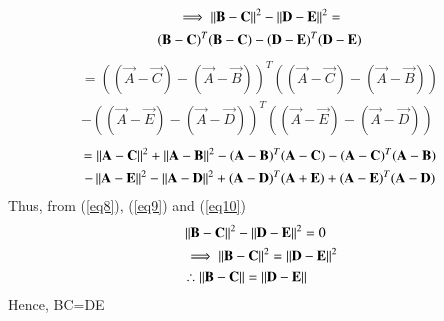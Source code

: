 \documentclass[journal,12pt,twocolumn]{IEEEtran}
\begin{document}
\begin{multline}
\implies \left\lVert\mathbf{B}-\mathbf{C}\right\rVert^2 - \left\lVert\mathbf{D}-\mathbf{E}\right\rVert^2=\\
(\mathbf B -\mathbf C)^T(\mathbf{B}-\mathbf{C})-(\mathbf D -\mathbf E)^T(\mathbf{D}-\mathbf{E})\label{eq11}
\end{multline}
\begin{multline}
=((\vec A -\vec C)-(\vec A -\vec B))^T((\vec A -\vec C)-(\vec A -\vec B))\\-((\vec A -\vec E)-(\vec A -\vec D))^T((\vec A -\vec E)-(\vec A -\vec D))\label{eq12}
\end{multline}
\begin{multline}
=\left\lVert\mathbf{A}-\mathbf{C}\right\rVert^2 + \left\lVert\mathbf{A}-\mathbf{B}\right\rVert^2- (\mathbf A -\mathbf B)^T(\mathbf{A}-\mathbf{C})-(\mathbf{A}-\mathbf{C})^T(\mathbf{A}-\mathbf{B})\\
-\left\lVert\mathbf{A}-\mathbf{E}\right\rVert^2 - \left\lVert\mathbf{A}-\mathbf{D}\right\rVert^2+ (\mathbf A -\mathbf D)^T(\mathbf{A}+\mathbf{E})+(\mathbf{A}-\mathbf{E})^T(\mathbf{A}-\mathbf{D})\label{eq13}
\end{multline}
Thus, from (\ref{eq8}), (\ref{eq9}) and (\ref{eq10})
\begin{align}
& \left\lVert\mathbf{B}-\mathbf{C}\right\rVert^2 - \left\lVert\mathbf{D}-\mathbf{E}\right\rVert^2=0\label{eq14}\\ 
& \implies \left\lVert\mathbf{B}-\mathbf{C}\right\rVert^2 = \left\lVert\mathbf{D}-\mathbf{E}\right\rVert^2 \label{eq15}\\
	& \therefore\left\lVert\mathbf{B}-\mathbf{C}\right\rVert = \left\lVert\mathbf{D}-\mathbf{E}\right\rVert\label{eq16}
\end{align}
Hence, BC=DE
\end{document}
